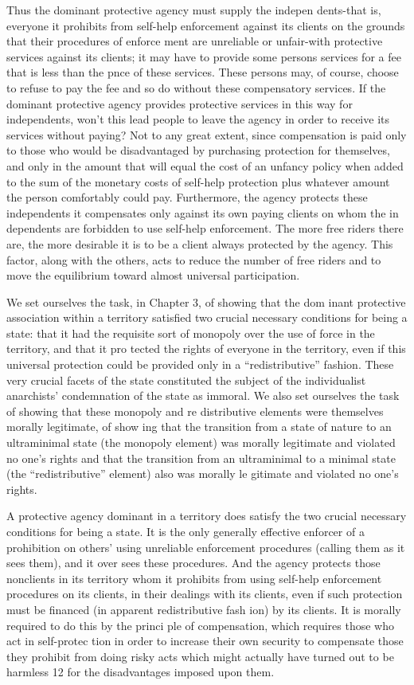 \documentclass[11pt,openany]{book}
\begin{document}
Thus the dominant protective agency must supply the indepen dents-that is, everyone it prohibits from self-help enforcement against its clients on the grounds that their procedures of enforce ment are unreliable or unfair-with protective services against its clients; it may have to provide some persons services for a fee that is less than the pnce of these services. These persons may, of course, choose to refuse to pay the fee and so do without these compensatory services. If the dominant protective agency provides protective services in this way for independents, won't this lead people to leave the agency in order to receive its services without paying? Not to any great extent, since compensation is paid only to those who would be disadvantaged by purchasing protection for themselves, and only in the amount that will equal the cost of an unfancy policy when added to the sum of the monetary costs of self-help protection plus whatever amount the person comfortably could pay. Furthermore, the agency protects these independents it compensates only against its own paying clients on whom the in dependents are forbidden to use self-help enforcement. The more free riders there are, the more desirable it is to be a client always protected by the agency. This factor, along with the others, acts to reduce the number of free riders and to move the equilibrium toward almost universal participation. 

We set ourselves the task, in Chapter 3, of showing that the dom inant protective association within a territory satisfied two crucial necessary conditions for being a state: that it had the requisite sort of monopoly over the use of force in the territory, and that it pro tected the rights of everyone in the territory, even if this universal protection could be provided only in a ``redistributive'' fashion. These very crucial facets of the state constituted the subject of the individualist anarchists' condemnation of the state as immoral. We also set ourselves the task of showing that these monopoly and re distributive elements were themselves morally legitimate, of show ing that the transition from a state of nature to an ultraminimal state (the monopoly element) was morally legitimate and violated no one's rights and that the transition from an ultraminimal to a minimal state (the ``redistributive'' element) also was morally le gitimate and violated no one's rights. 

A protective agency dominant in a territory does satisfy the two crucial necessary conditions for being a state. It is the only generally effective enforcer of a prohibition on others' using unreliable enforcement procedures (calling them as it sees them), and it over sees these procedures. And the agency protects those nonclients in its territory whom it prohibits from using self-help enforcement procedures on its clients, in their dealings with its clients, even if such protection must be financed (in apparent redistributive fash ion) by its clients. It is morally required to do this by the princi ple of compensation, which requires those who act in self-protec tion in order to increase their own security to compensate those they prohibit from doing risky acts which might actually have turned out to be harmless 12 for the disadvantages imposed upon them. 
\end{document}
